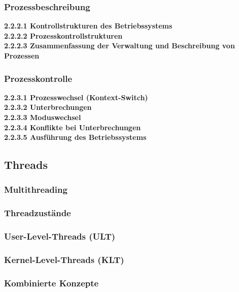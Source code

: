 \documentclass{article}
\begin{document}
\subsubsection{Prozessbeschreibung}
    \textbf{2.2.2.1 Kontrollstrukturen des Betriebssystems}\newline
    \\
    \textbf{2.2.2.2 Prozesskontrollstrukturen}\newline
    \\
    \textbf{2.2.2.3 Zusammenfassung der Verwaltung und Beschreibung von Prozessen}\newline
\subsubsection{Prozesskontrolle}
    \textbf{2.2.3.1 Prozesswechsel (Kontext-Switch)}\newline
    \\
    \textbf{2.2.3.2 Unterbrechungen}\newline
    \\
    \textbf{2.2.3.3 Moduswechsel}\newline
    \\
    \textbf{2.2.3.4 Konflikte bei Unterbrechungen}\newline
    \\
    \textbf{2.2.3.5 Ausführung des Betriebssystems}\newline
\subsection{Threads}
\subsubsection{Multithreading}
\subsubsection{Threadzustände}
\subsubsection{User-Level-Threads (ULT)}
\subsubsection{Kernel-Level-Threads (KLT)}
\subsubsection{Kombinierte Konzepte}
\end{document}
